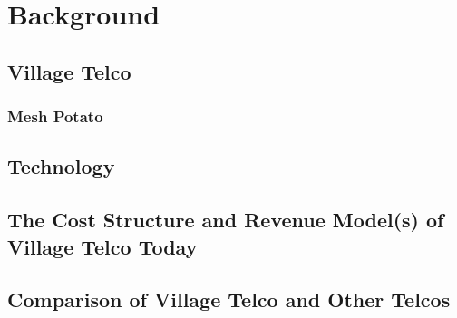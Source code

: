 \chapter{Background}
\label{chp:background} 

\section{Village Telco}

\subsection{Mesh Potato}

\section{Technology}

\section{The Cost Structure and Revenue Model(s) of Village Telco Today}

\section{Comparison of Village Telco and Other Telcos}